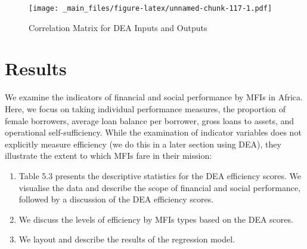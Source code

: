\documentclass[a4paper, nobind]{templates/ociamthesis}
\providecommand{\tightlist}{%
  \setlength{\itemsep}{0pt}\setlength{\parskip}{0pt}}
\begin{document}
\begin{table}
\begin{tabu}
\\
\\
\\
\\
\\
\end{tabu}
\end{table}

\begin{landscape}

\newpage

\begin{figure}
\centering
\texttt{[image: \_main\_files/figure-latex/unnamed-chunk-117-1.pdf]}
\caption{\label{fig:unnamed-chunk-117}Correlation Matrix for DEA Inputs and Outputs}
\end{figure}

\end{landscape}

\newpage

\hypertarget{results-1}{%
\section{Results}\label{results-1}}

We examine the indicators of financial and social performance by MFIs in Africa. Here, we focus on taking individual performance measures, the proportion of female borrowers, average loan balance per borrower, gross loans to assets, and operational self-sufficiency. While the examination of indicator variables does not explicitly measure efficiency (we do this in a later section using DEA), they illustrate the extent to which MFIs fare in their mission:

\begin{enumerate}
\def\labelenumi{\arabic{enumi}.}
\tightlist
\item
  Table 5.3 presents the descriptive statistics for the DEA efficiency scores. We visualise the data and describe the scope of financial and social performance, followed by a discussion of the DEA efficiency scores.
\item
  We discuss the levels of efficiency by MFIs types based on the DEA scores.
\item
  We layout and describe the results of the regression model.
\end{enumerate}
\end{document}
